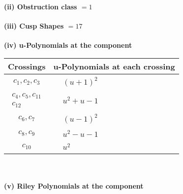 \documentclass[1p]{elsarticle_modified}
\theoremstyle{definition}
\begin{document}
\flushleft \textbf{(ii) Obstruction class $= 1$}\\~\\
\flushleft \textbf{(iii) Cusp Shapes $= 17$}\\~\\
\newpage\renewcommand{\arraystretch}{1}
\flushleft \textbf{(iv) u-Polynomials at the component}\newline \\
\begin{tabular}{m{50pt}|m{274pt}}
Crossings & \hspace{64pt}u-Polynomials at each crossing \\
\hline $$\begin{aligned}c_{1},c_{2},c_{3}\end{aligned}$$&$\begin{aligned}
&(u+1)^2
\end{aligned}$\\
\hline $$\begin{aligned}c_{4},c_{5},c_{11}\\c_{12}\end{aligned}$$&$\begin{aligned}
&u^2+u-1
\end{aligned}$\\
\hline $$\begin{aligned}c_{6},c_{7}\end{aligned}$$&$\begin{aligned}
&(u-1)^2
\end{aligned}$\\
\hline $$\begin{aligned}c_{8},c_{9}\end{aligned}$$&$\begin{aligned}
&u^2- u-1
\end{aligned}$\\
\hline $$\begin{aligned}c_{10}\end{aligned}$$&$\begin{aligned}
&u^2
\end{aligned}$\\
\hline
\end{tabular}\\~\\
\newpage\renewcommand{\arraystretch}{1}
\flushleft \textbf{(v) Riley Polynomials at the component}\newline \\
\end{document}
